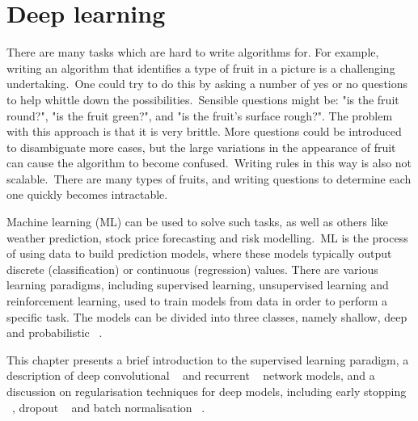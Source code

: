 
\chapter{Deep learning}

\ifpdf
     \graphicspath{{Figs/Chapter2/}}
\else
    \graphicspath{{Chapter2/Figs/Vector/}{Chapter2/Figs/}}
\fi


There are many tasks which are hard to write algorithms for. For example, writing an algorithm that identifies a type of fruit in a picture is a challenging undertaking.\ One could try to do this by asking a number of yes or no questions to help whittle down the possibilities.\ Sensible questions might be: "is the fruit round?", "is the fruit green?", and "is the fruit's surface rough?". The problem with this approach is that it is very brittle. More questions could be introduced to disambiguate more cases, but the large variations in the appearance of fruit can cause the algorithm to become confused.\ Writing rules in this way is also not scalable.\ There are many types of fruits, and writing questions to determine each one quickly becomes intractable. \par
 
\noindent Machine learning (ML) can be used to solve such tasks, as well as others like weather prediction, stock price forecasting and risk modelling.\ ML is the process of using data to build prediction models, where these models typically output discrete (classification) or continuous (regression) values. There are various learning paradigms, including supervised learning, unsupervised learning and reinforcement learning, used to train models from data in order to perform a specific task. The models can be divided into three classes, namely shallow, deep and probabilistic ~\citep{hastie2009elements}. \par

\noindent This chapter presents a brief introduction to the supervised learning paradigm, a description of deep convolutional \unskip ~\citep{lecun1998gradient} and recurrent \unskip ~\citep{werbos1988generalization} network models, and a discussion on regularisation techniques for deep models, including early stopping \unskip~\citep{prechelt1998early}, dropout \unskip ~\citep{srivastava2014dropout} and batch normalisation \unskip ~\citep{ioffe2015batch}. 



